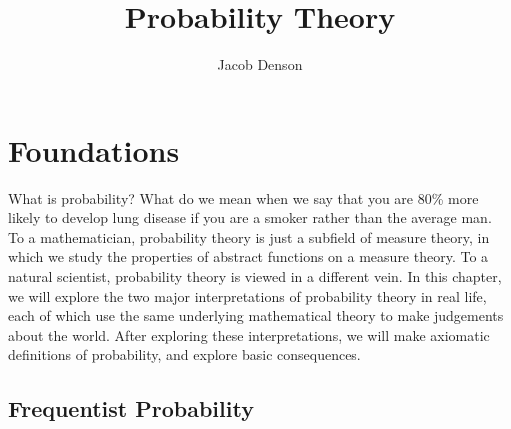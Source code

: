 

\DeclareMathOperator{\Prob}{\mathbf{P}}
\DeclareMathOperator{\Ber}{Ber}
\DeclareMathOperator{\Bin}{Bin}
\DeclareMathOperator{\Geo}{Geo}
\DeclareMathOperator{\Poisson}{Poisson}
\DeclareMathOperator{\Uni}{Uni}
\DeclareMathOperator{\Multi}{mult}
\DeclareMathOperator{\expect}{\mathbf{E}}

\title{Probability Theory}
\author{Jacob Denson}



\maketitle
\tableofcontents
{}

\chapter{Foundations}

What is probability? What do we mean when we say that you are 80\% more likely to develop lung disease if you are a smoker rather than the average man. To a mathematician, probability theory is just a subfield of measure theory, in which we study the properties of abstract functions on a measure theory. To a natural scientist, probability theory is viewed in a different vein. In this chapter, we will explore the two major interpretations of probability theory in real life, each of which use the same underlying mathematical theory to make judgements about the world. After exploring these interpretations, we will make axiomatic definitions of probability, and explore basic consequences.

\section{Frequentist Probability}

